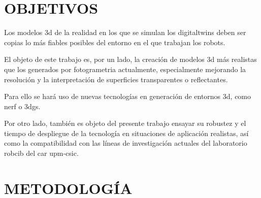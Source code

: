 \documentclass[a4paper, 12pt, spanish, twoside]{article}
\begin{document}






\clearpage





\newpage
\section{OBJETIVOS} \label{sec:objetivos}

Los modelos \acrshort{3d} de la realidad en los que se simulan los \glspl{digitaltwin} deben ser copias lo más fiables posibles del entorno en el que trabajan los robots. 

El objeto de este trabajo es, por un lado, la creación de modelos \acrshort{3d} más realistas que los generados por \gls{fotogrametria} actualmente, especialmente mejorando la resolución y la interpretación de superficies transparentes o reflectantes. 

Para ello se hará uso de nuevas tecnologías en generación de entornos \acrshort{3d}, como \acrfull{nerf} o \acrfull{3dgs}.

Por otro lado, también es objeto del presente trabajo ensayar su robustez y el tiempo de despliegue de la tecnología en situaciones de aplicación realistas, así como la compatibilidad con las líneas de investigación actuales del laboratorio \acrshort{robcib} del \acrshort{car} \acrshort{upm}-\acrshort{csic}.

\clearpage





\newpage
\section{METODOLOGÍA} \label{sec:metodologia}
\end{document}
